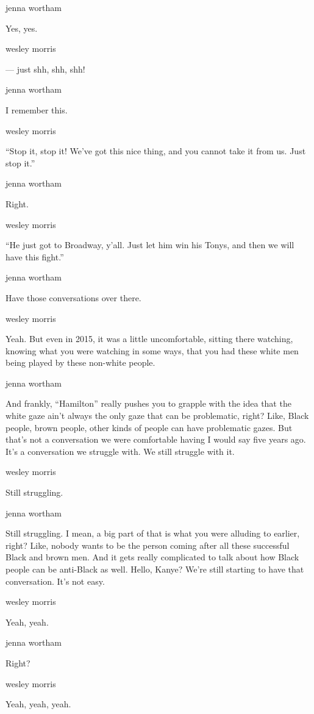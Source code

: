 jenna wortham

Yes, yes.

wesley morris

--- just shh, shh, shh!

jenna wortham

I remember this.

wesley morris

``Stop it, stop it! We've got this nice thing, and you cannot take it
from us. Just stop it.''

jenna wortham

Right.

wesley morris

``He just got to Broadway, y'all. Just let him win his Tonys, and then
we will have this fight.''

jenna wortham

Have those conversations over there.

wesley morris

Yeah. But even in 2015, it was a little uncomfortable, sitting there
watching, knowing what you were watching in some ways, that you had
these white men being played by these non-white people.

jenna wortham

And frankly, ``Hamilton'' really pushes you to grapple with the idea
that the white gaze ain't always the only gaze that can be problematic,
right? Like, Black people, brown people, other kinds of people can have
problematic gazes. But that's not a conversation we were comfortable
having I would say five years ago. It's a conversation we struggle with.
We still struggle with it.

wesley morris

Still struggling.

jenna wortham

Still struggling. I mean, a big part of that is what you were alluding
to earlier, right? Like, nobody wants to be the person coming after all
these successful Black and brown men. And it gets really complicated to
talk about how Black people can be anti-Black as well. Hello, Kanye?
We're still starting to have that conversation. It's not easy.

wesley morris

Yeah, yeah.

jenna wortham

Right?

wesley morris

Yeah, yeah, yeah.

